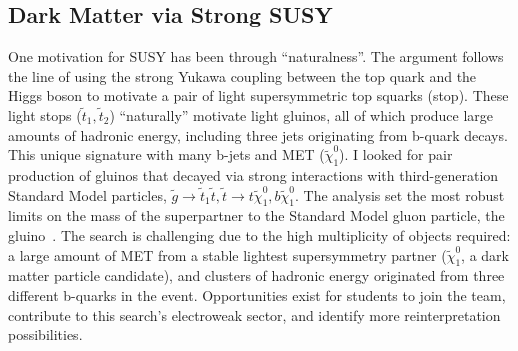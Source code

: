 \documentclass[10pt,a4paper,sans]{moderncv/moderncv} %
\begin{document}
\subsection{Dark Matter via Strong SUSY}
One motivation for SUSY has been through ``naturalness''. The argument follows the line of using the strong Yukawa coupling between the top quark and the Higgs boson to motivate a pair of light supersymmetric top squarks (stop). These light stops ($\tilde{t}_1, \tilde{t}_2$) ``naturally'' motivate light gluinos, all of which produce large amounts of hadronic energy, including three jets originating from b-quark decays. This unique signature with many b-jets and MET ($\tilde{\chi}_1^0$). I looked for pair production of gluinos that decayed via strong interactions with third-generation Standard Model particles, $\tilde{g} \to \tilde{t}_1 \tilde{t},  \tilde{t} \to t\tilde{\chi}_1^0, b\tilde{\chi}_1^0$. The analysis set the most robust limits on the mass of the superpartner to the Standard Model gluon particle, the gluino~\cite{SUSY-2016-10, SUSY-2015-10}.  The search is challenging due to the high multiplicity of objects required: a large amount of MET from a stable lightest supersymmetry partner ($\tilde{\chi}_1^0$, a dark matter particle candidate), and clusters of hadronic energy originated from three different b-quarks in the event. Opportunities exist for students to join the team, contribute to this search's electroweak sector, and identify more reinterpretation possibilities.
\end{document}
